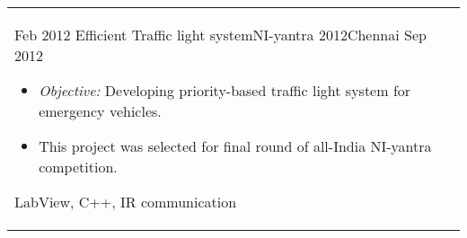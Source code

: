 \begin{longtable}{R{2.5cm}|p{14.8cm}}
	\experience 
	{Feb 2012} {Efficient Traffic light system}{NI-yantra 2012}{Chennai}
	{Sep 2012}	{
		\begin{itemize}
			\item \textit{Objective:} Developing priority-based traffic light system for emergency vehicles.
			\item This project was selected for final round of all-India NI-yantra competition.
		\end{itemize}	
	}	{LabView, C++, IR communication }

\end{longtable}

%
%
